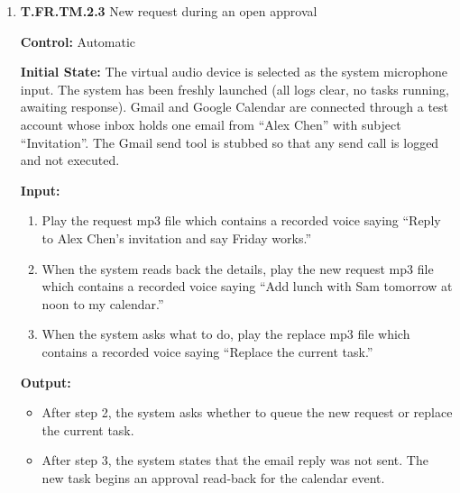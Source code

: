 \documentclass[12pt, titlepage]{article}
\begin{document}
\begin{enumerate}
\textbf{Test Case Derivation:} FR7 requires a disconnection to pause the task and for it to not resume until explicitly instructed. 
On reconnection, the system state must be reconciled and reported. FR21 requires the same state to be announced at session start, with resumption only after a state check.
Disconnecting the client while a write is pending satisfies both of these checks. Verifies FR7 and FR21.

\textbf{Pass/Fail Criteria:}
\begin{itemize}
  \item All Output conditions hold.
  \item The create stub is called exactly once.
\end{itemize}

\textbf{How test will be performed:} A script plays the audio files into the virtual device and disconnects and reconnects the client at the stated steps. It reads the task manager state log, the tool call log, and the text of system speech, and asserts each output condition.

\item{\textbf{T.FR.TM.2.3} New request during an open approval\\}\label{test:T.FR.TM.2.3}

\textbf{Control:} Automatic

\textbf{Initial State:} The virtual audio device is selected as the system microphone input. The system has been freshly launched (all logs clear, no tasks running, awaiting response).
Gmail and Google Calendar are connected through a test account whose inbox holds one email from ``Alex Chen'' with subject ``Invitation''. 
The Gmail send tool is stubbed so that any send call is logged and not executed.

\textbf{Input:}
\begin{enumerate}
  \item Play the request mp3 file which contains a recorded voice saying ``Reply to Alex Chen's invitation and say Friday works.''
  \item When the system reads back the details, play the new request mp3 file which contains a recorded voice saying ``Add lunch with Sam tomorrow at noon to my calendar.''
  \item When the system asks what to do, play the replace mp3 file which contains a recorded voice saying ``Replace the current task.''
\end{enumerate}

\textbf{Output:}
\begin{itemize}
  \item After step 2, the system asks whether to queue the new request or replace the current task.
  \item After step 3, the system states that the email reply was not sent. The new task begins an approval read-back for the calendar event.
\end{itemize}


\end{enumerate}
\end{document}
